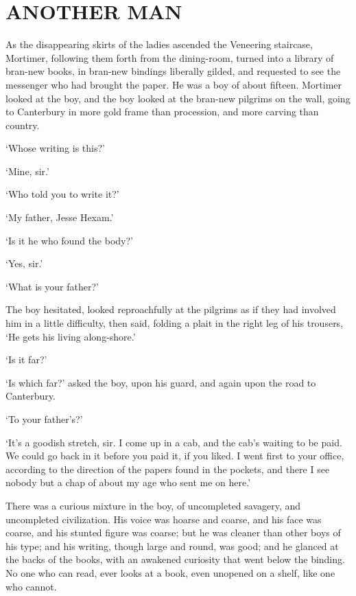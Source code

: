 
\chapter{ANOTHER MAN}

As the disappearing skirts of the ladies ascended the Veneering
staircase, Mortimer, following them forth from the dining-room, turned
into a library of bran-new books, in bran-new bindings liberally gilded,
and requested to see the messenger who had brought the paper. He was a
boy of about fifteen. Mortimer looked at the boy, and the boy looked
at the bran-new pilgrims on the wall, going to Canterbury in more gold
frame than procession, and more carving than country.

‘Whose writing is this?’

‘Mine, sir.’

‘Who told you to write it?’

‘My father, Jesse Hexam.’

‘Is it he who found the body?’

‘Yes, sir.’

‘What is your father?’

The boy hesitated, looked reproachfully at the pilgrims as if they had
involved him in a little difficulty, then said, folding a plait in the
right leg of his trousers, ‘He gets his living along-shore.’

‘Is it far?’

‘Is which far?’ asked the boy, upon his guard, and again upon the road
to Canterbury.

‘To your father’s?’

‘It’s a goodish stretch, sir. I come up in a cab, and the cab’s waiting
to be paid. We could go back in it before you paid it, if you liked.
I went first to your office, according to the direction of the papers
found in the pockets, and there I see nobody but a chap of about my age
who sent me on here.’

There was a curious mixture in the boy, of uncompleted savagery, and
uncompleted civilization. His voice was hoarse and coarse, and his face
was coarse, and his stunted figure was coarse; but he was cleaner than
other boys of his type; and his writing, though large and round,
was good; and he glanced at the backs of the books, with an awakened
curiosity that went below the binding. No one who can read, ever looks
at a book, even unopened on a shelf, like one who cannot.

